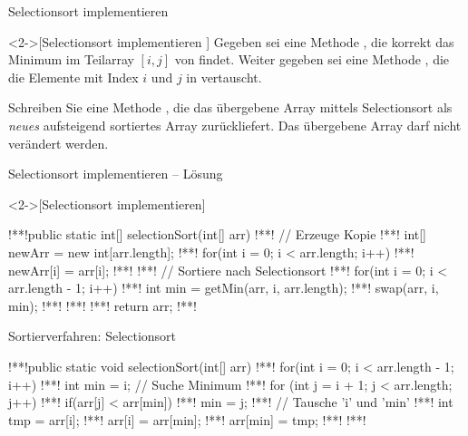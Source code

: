 \ifull
\begin{frame}[c]{Selectionsort implementieren}
    \begin{exercise}<2->[Selectionsort implementieren ]
        \pause{}Gegeben sei eine Methode , die korrekt das Minimum im Teilarray \([i, j]\) von  findet. Weiter gegeben sei eine Methode , die die Elemente mit Index \(i\) und \(j\) in  vertauscht.\medskip\par\pause Schreiben Sie eine Methode , die das übergebene Array mittels Selectionsort als \emph{neues} aufsteigend sortiertes Array zurückliefert. Das übergebene Array darf nicht verändert werden.
    \end{exercise}
\end{frame}

\begin{frame}[fragile,c]{Selectionsort implementieren -- Lösung}
    \begin{solve}<2->[Selectionsort implementieren]
\begin{plainjava}
!**!public static int[] selectionSort(int[] arr) {
!**!    // Erzeuge Kopie
!**!    int[] newArr = new int[arr.length];
!**!    for(int i = 0; i < arr.length; i++)
!**!        newArr[i] = arr[i];
!**!
!**!    // Sortiere nach Selectionsort
!**!    for(int i = 0; i < arr.length - 1; i++) {
!**!        int min = getMin(arr, i, arr.length);
!**!        swap(arr, i, min);
!**!    }
!**!
!**!    return arr;
!**!}
\end{plainjava}
    \end{solve}
\end{frame}
\fi

\begin{frame}[fragile,c]{Sortierverfahren: Selectionsort}
    \begin{plainjava}
!**!public static void selectionSort(int[] arr) {
!**!    for(int i = 0; i < arr.length - 1; i++) {
!**!        int min = i; // Suche Minimum
!**!        for (int j = i + 1; j < arr.length; j++)
!**!            if(arr[j] < arr[min])
!**!                min = j;
!**!        // Tausche 'i' und 'min'
!**!        int tmp = arr[i];
!**!        arr[i] = arr[min];
!**!        arr[min] = tmp;
!**!    }
!**!}
    \end{plainjava}
\end{frame}

